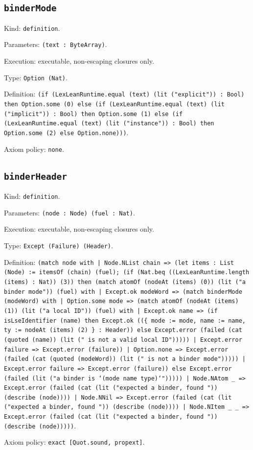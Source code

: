\documentclass[11pt]{article}
\begin{document}
\subsection*{\texttt{binderMode}}
\noindent Kind: \texttt{definition}.\par
\noindent Parameters: \texttt{(text : ByteArray)}.\par
\noindent Execution: executable, non-escaping closures only.\par
\noindent Type: \texttt{Option (Nat)}.\par
\noindent Definition: \texttt{(if (LexLeanRuntime.equal (text) (lit ("explicit")) : Bool) then Option.some (0) else (if (LexLeanRuntime.equal (text) (lit ("implicit")) : Bool) then Option.some (1) else (if (LexLeanRuntime.equal (text) (lit ("instance")) : Bool) then Option.some (2) else Option.none)))}.\par
\noindent Axiom policy: \texttt{none}.\par
\subsection*{\texttt{binderHeader}}
\noindent Kind: \texttt{definition}.\par
\noindent Parameters: \texttt{(node : Node) (fuel : Nat)}.\par
\noindent Execution: executable, non-escaping closures only.\par
\noindent Type: \texttt{Except (Failure) (Header)}.\par
\noindent Definition: \texttt{(match node with | Node.NList chain => (let items : List (Node) := itemsOf (chain) (fuel); (if (Nat.beq ((LexLeanRuntime.length (items) : Nat)) (3)) then (match atomOf (nodeAt (items) (0)) (lit ("a binder mode")) (fuel) with | Except.ok modeWord => (match binderMode (modeWord) with | Option.some mode => (match atomOf (nodeAt (items) (1)) (lit ("a local ID")) (fuel) with | Except.ok name => (if isLseIdentifier (name) then Except.ok ((\{ mode := mode, name := name, ty := nodeAt (items) (2) \} : Header)) else Except.error (failed (cat (quoted (name)) (lit (" is not a valid local ID"))))) | Except.error failure => Except.error (failure)) | Option.none => Except.error (failed (cat (quoted (modeWord)) (lit (" is not a binder mode"))))) | Except.error failure => Except.error (failure)) else Except.error (failed (lit ("a binder is `(mode name type)`"))))) | Node.NAtom \_ => Except.error (failed (cat (lit ("expected a binder, found ")) (describe (node)))) | Node.NNil => Except.error (failed (cat (lit ("expected a binder, found ")) (describe (node)))) | Node.NItem \_ \_ => Except.error (failed (cat (lit ("expected a binder, found ")) (describe (node)))))}.\par
\noindent Axiom policy: \texttt{exact [Quot.sound, propext]}.\par
\end{document}
